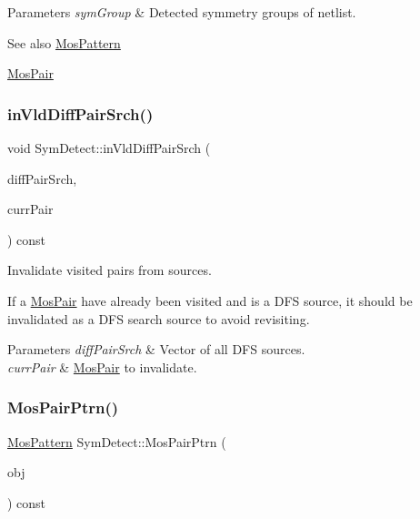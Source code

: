 \begin{DoxyParams}{Parameters}
{\em sym\+Group} & Detected symmetry groups of netlist. \\
\hline
\end{DoxyParams}
\begin{DoxySeeAlso}{See also}
\hyperlink{type_8h_af19eddb079bfea723256710b029c38e8}{Mos\+Pattern} 

\hyperlink{classMosPair}{Mos\+Pair} 
\end{DoxySeeAlso}
\mbox{\label{classSymDetect_ae6a1ba27f6768f215cba0623b6e2ce08}} 
\subsubsection{\texorpdfstring{in\+Vld\+Diff\+Pair\+Srch()}{inVldDiffPairSrch()}}
{\footnotesize\ttfamily void Sym\+Detect\+::in\+Vld\+Diff\+Pair\+Srch (\begin{DoxyParamCaption}\item[{std\+::vector$<$ \hyperlink{classMosPair}{Mos\+Pair} $>$ \&}]{diff\+Pair\+Srch,  }\item[{\hyperlink{classMosPair}{Mos\+Pair} \&}]{curr\+Pair }\end{DoxyParamCaption}) const\hspace{0.3cm}{\ttfamily [private]}}



Invalidate visited pairs from sources. 

If a \hyperlink{classMosPair}{Mos\+Pair} have already been visited and is a D\+FS source, it should be invalidated as a D\+FS search source to avoid revisiting.


\begin{DoxyParams}{Parameters}
{\em diff\+Pair\+Srch} & Vector of all D\+FS sources. \\
\hline
{\em curr\+Pair} & \hyperlink{classMosPair}{Mos\+Pair} to invalidate. \\
\hline
\end{DoxyParams}
\mbox{\label{classSymDetect_aa832e51051f0ed9d3643c72b1d738684}} 
\subsubsection{\texorpdfstring{Mos\+Pair\+Ptrn()}{MosPairPtrn()}}
{\footnotesize\ttfamily \hyperlink{type_8h_af19eddb079bfea723256710b029c38e8}{Mos\+Pattern} Sym\+Detect\+::\+Mos\+Pair\+Ptrn (\begin{DoxyParamCaption}\item[{\hyperlink{classMosPair}{Mos\+Pair} \&}]{obj }\end{DoxyParamCaption}) const\hspace{0.3cm}{\ttfamily [private]}}



